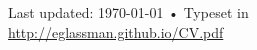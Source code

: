 \documentclass[10pt, a4paper]{article}
\begin{document}








\vfill{}

\begin{center}
{\scriptsize  Last updated: \today\- •\- 
Typeset in \href{http://nitens.org/taraborelli/cvtex}{
\XeTeX }\\
\href{http://eglassman.github.io/CV.pdf}{http://eglassman.github.io/CV.pdf}}
\end{center}
\end{document}
